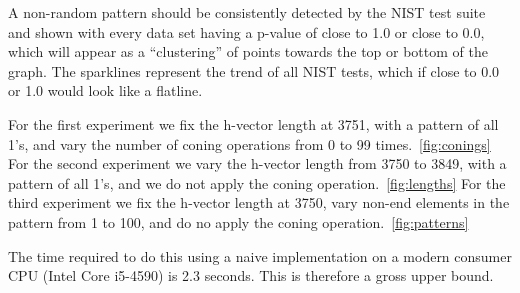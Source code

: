 \documentclass[oneside,12pt]{amsart}
\theoremstyle{definition}
\numberwithin{equation}{section}
\begin{document}
A non-random pattern should be consistently detected by the NIST test suite and shown with every data set having a p-value of close to 1.0 or close to 0.0, which will appear as a ``clustering'' of points towards the top or bottom of the graph. The sparklines represent the trend of all NIST tests, which if close to 0.0 or 1.0 would look like a flatline. 

For the first experiment we fix the h-vector length at 3751, with a pattern of all 1's, and vary the number of coning operations from 0 to 99 times.~\ref{fig:conings}  %
For the second experiment we vary the h-vector length from 3750 to 3849, with a pattern of all 1's, and we do not apply the coning operation.~\ref{fig:lengths}   %
For the third experiment we fix the h-vector length at 3750, vary non-end elements in the pattern from 1 to 100, and do no apply the coning operation.~\ref{fig:patterns}  %

The time required to do this using a naive implementation on a modern consumer CPU (Intel Core i5-4590) is 2.3 seconds. This is therefore a gross upper bound.

\end{document}
